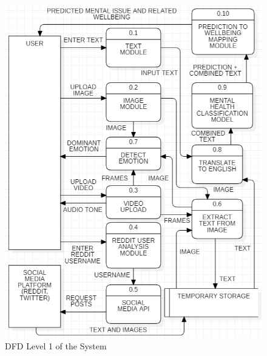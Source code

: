 \begin{figure}[h!]  
    \centering
    \includegraphics[width=1.0\textwidth]{Images/DFD L1.png}  
    \caption{DFD Level 1 of the System}
    \label{dfdl1}  %
\end{figure}










